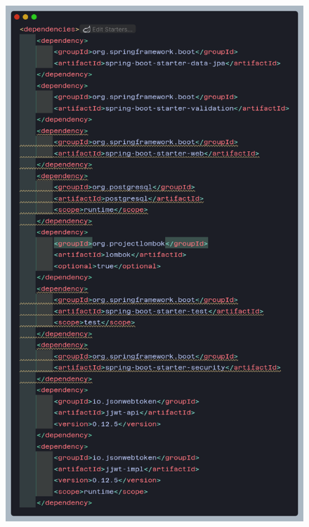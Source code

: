  \label{app:dependencias-api}

\begin{figure}[H]
    \centering
    \includegraphics[width=.8\textwidth]{resources/images/dependencias-anexo-1}\label{fig:dependencias Api 1}
\end{figure}

